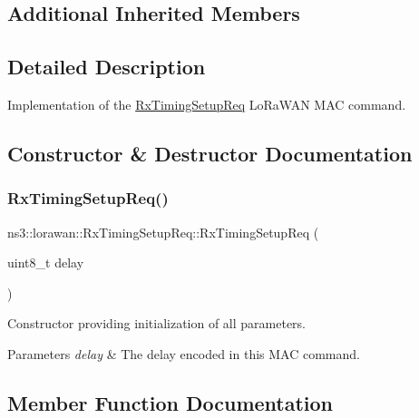 \subsection*{Additional Inherited Members}


\subsection{Detailed Description}
Implementation of the \hyperlink{classns3_1_1lorawan_1_1RxTimingSetupReq}{Rx\+Timing\+Setup\+Req} Lo\+Ra\+W\+AN M\+AC command. 

\subsection{Constructor \& Destructor Documentation}
\mbox{\label{classns3_1_1lorawan_1_1RxTimingSetupReq_afc2307d4f27e6084ef9099498304fb13}} 
\subsubsection{\texorpdfstring{Rx\+Timing\+Setup\+Req()}{RxTimingSetupReq()}}
{\footnotesize\ttfamily ns3\+::lorawan\+::\+Rx\+Timing\+Setup\+Req\+::\+Rx\+Timing\+Setup\+Req (\begin{DoxyParamCaption}\item[{uint8\+\_\+t}]{delay }\end{DoxyParamCaption})}

Constructor providing initialization of all parameters.


\begin{DoxyParams}{Parameters}
{\em delay} & The delay encoded in this M\+AC command. \\
\hline
\end{DoxyParams}


\subsection{Member Function Documentation}
\mbox{\label{classns3_1_1lorawan_1_1RxTimingSetupReq_aeee7f2141079bc7cd2471a42e2199715}} 
